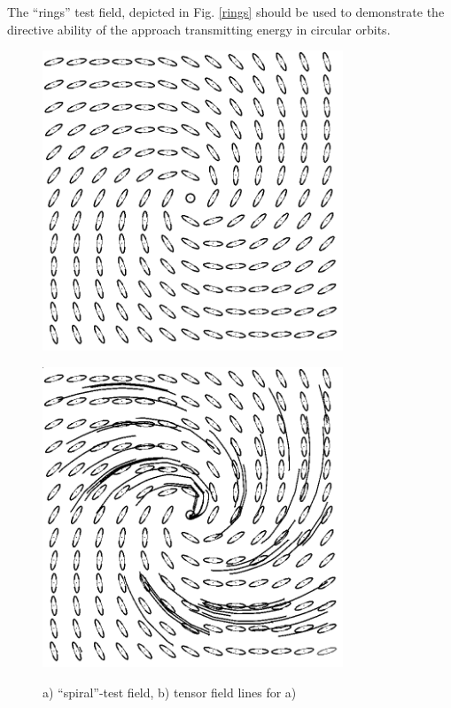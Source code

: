 \documentclass{scrartcl}
\begin{document}
The ``rings'' test field, depicted in Fig. \ref{rings} should be used to demonstrate the directive ability of the approach transmitting energy in circular orbits.
\begin{figure}[!t]
\centering
  \begin{minipage}{0.4\textwidth}
    \includegraphics[width=0.8\textwidth]{img/spiral.png}
    \label{a)}
  \end{minipage}
  \begin{minipage}{0.4\textwidth}
    \includegraphics[width=0.8\textwidth]{img/spiral-TFL.png}
    \label{b)}
  \end{minipage}
\caption{a) ``spiral''-test field, b) tensor field lines for a)}
\label{spiral}
\end{figure}
\end{document}
